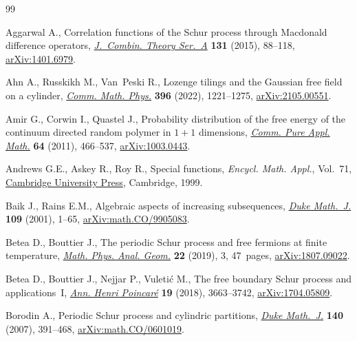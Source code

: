 \documentclass[pdftex]{sigma}
\numberwithin{equation}{section}
\begin{document}
\begin{thebibliography}{99}
\footnotesize\itemsep=0pt

Aggarwal A., Correlation functions of the {S}chur process through {M}acdonald
 difference operators, \href{https://doi.org/10.1016/j.jcta.2014.11.009}{\textit{J.~Combin. Theory Ser.~A}} \textbf{131} (2015),
 88--118, \href{https://arxiv.org/abs/1401.6979}{arXiv:1401.6979}.

Ahn A., Russkikh M., Van~Peski R., Lozenge tilings and the {G}aussian free
 field on a cylinder, \href{https://doi.org/10.1007/s00220-022-04491-x}{\textit{Comm. Math. Phys.}} \textbf{396} (2022),
 1221--1275, \href{https://arxiv.org/abs/2105.00551}{arXiv:2105.00551}.

Amir G., Corwin I., Quastel J., Probability distribution of the free energy of
 the continuum directed random polymer in {$1+1$} dimensions, \href{https://doi.org/10.1002/cpa.20347}{\textit{Comm.
 Pure Appl. Math.}} \textbf{64} (2011), 466--537, \href{https://arxiv.org/abs/1003.0443}{arXiv:1003.0443}.

Andrews G.E., Askey R., Roy R., Special functions, \textit{Encycl. Math.
 Appl.}, Vol.~71, \href{https://doi.org/10.1017/CBO9781107325937}{Cambridge University Press}, Cambridge, 1999.

Baik J., Rains E.M., Algebraic aspects of increasing subsequences, \href{https://doi.org/10.1215/S0012-7094-01-10911-3}{\textit{Duke
 Math.~J.}} \textbf{109} (2001), 1--65, \href{https://arxiv.org/abs/math.CO/9905083}{arXiv:math.CO/9905083}.

Betea D., Bouttier J., The periodic {S}chur process and free fermions at finite
 temperature, \href{https://doi.org/10.1007/s11040-018-9299-8}{\textit{Math. Phys. Anal. Geom.}} \textbf{22} (2019), 3,
 47~pages, \href{https://arxiv.org/abs/1807.09022}{arXiv:1807.09022}.

Betea D., Bouttier J., Nejjar P., Vuleti\'c M., The free boundary {S}chur
 process and applications~{I}, \href{https://doi.org/10.1007/s00023-018-0723-1}{\textit{Ann. Henri Poincar\'e}} \textbf{19}
 (2018), 3663--3742, \href{https://arxiv.org/abs/1704.05809}{arXiv:1704.05809}.

Borodin A., Periodic {S}chur process and cylindric partitions, \href{https://doi.org/10.1215/S0012-7094-07-14031-6}{\textit{Duke
 Math.~J.}} \textbf{140} (2007), 391--468, \href{https://arxiv.org/abs/math.CO/0601019}{arXiv:math.CO/0601019}.


\end{thebibliography}
\end{document}
